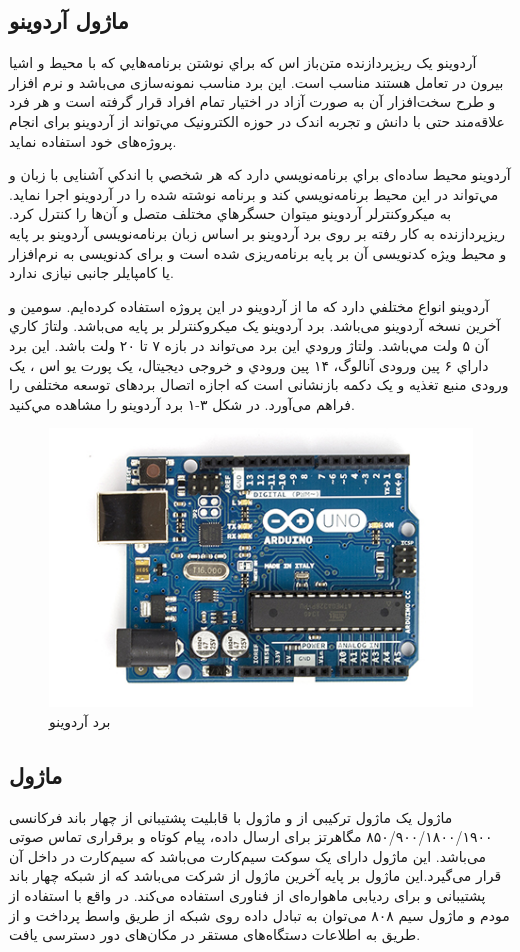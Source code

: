 \subsection{ماژول آردوینو}
آردوينو يک ريزپردازنده متن‌باز اس كه براي نوشتن برنامه‌هايي كه با محیط و اشیا بیرون در تعامل هستند مناسب است. این برد مناسب نمونه‌سازی می‌باشد و نرم افزار و طرح سخت‌افزار آن به صورت آزاد در اختیار تمام افراد قرار گرفته است و هر فرد علاقه‌مند حتی با دانش و تجربه اندک در حوزه الکترونیک مي‌تواند از آردوینو برای انجام پروژه‌های خود استفاده نماید.


آردوينو محیط ساده‌ای براي برنامه‌نويسي دارد كه هر شخصي با اندكي آشنایی با زبان  و   مي‌تواند در این محیط برنامه‌نويسي كند و برنامه نوشته شده را در آردوینو اجرا نماید. به ميكروكنترلر آردوينو ميتوان حسگرهاي مختلف متصل و آن‌ها را كنترل كرد. ریزپردازنده به‌ کار رفته بر روی برد آردوینو بر اساس زبان برنامه‌نویسی آردوینو بر پایه  و محیط ویژه کدنویسی آن بر پایه برنامه‌ریزی شده است و برای کدنویسی به نرم‌افزار یا کامپایلر جانبی نیازی ندارد. 


آردوينو انواع مختلفي دارد كه ما از آردوینو  در این پروژه استفاده کرده‌ایم.  سومین و آخرین نسخه آردوینو  می‌باشد. برد آردوینو  یک میکروکنترلر بر پایه  می‌باشد. ولتاژ كاري آن ۵ ولت مي‌باشد. ولتاژ ورودي این برد می‌تواند در بازه ۷ تا ۲۰ ولت باشد. این برد داراي ۶ پین ورودی آنالوگ، ۱۴ پين ورودي و خروجی ديجيتال، یک پورت یو اس ، یک ورودی منبع تغذیه و یک دکمه بازنشانی  است که اجازه اتصال بردهای توسعه مختلفی را فراهم می‌آورد. در شكل ۳-۱ برد آردوينو  را مشاهده مي‌كنيد.
\begin{figure}[!h]
	\centerline{\includegraphics[width=.5\textwidth]{ArduinoUno_R3}}
	\caption{برد آردوینو }
\end{figure}
\subsection{ماژول }

ماژول  یک ماژول ترکیبی از  و ماژول   با قابلیت پشتیبانی از چهار باند فرکانسی ۸۵۰/۹۰۰/۱۸۰۰/۱۹۰۰ مگاهرتز  برای ارسال داده، پیام کوتاه  و برقراری تماس صوتی می‌باشد. این ماژول دارای یک سوکت سیم‌کارت می‌باشد که سیم‌کارت در داخل آن قرار می‌گیرد.این ماژول بر پایه آخرین ماژول  از شرکت  می‌باشد که از شبکه چهار باند  پشتیبانی و برای ردیابی ماهواره‌ای از فناوری  استفاده می‌کند. در واقع با استفاده از مودم  و ماژول سیم ۸۰۸ می‌توان به تبادل داده روی شبکه  از طریق واسط  پرداخت و از طریق به اطلاعات دستگاه‌های مستقر در مکان‌های دور دسترسی یافت.

